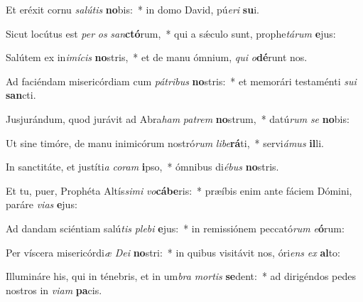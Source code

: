 \item Et eréxit cornu \textit{salútis} \textbf{no}bis:~* in domo David, pú\textit{eri} \textbf{su}i.
\item Sicut locútus est \textit{per} \textit{os} \textit{san}\textbf{ctó}rum,~* qui a sǽculo sunt, prophe\textit{tárum} \textbf{e}jus:
\item Salútem ex in\textit{imícis} \textbf{no}stris,~* et de manu ómnium, \textit{qui} \textit{o}\textbf{dé}runt nos.
\item Ad faciéndam misericórdiam cum \textit{pátribus} \textbf{no}stris:~* et memorári testaménti \textit{sui} \textbf{san}cti.
\item Jusjurándum, quod jurávit ad Abra\textit{ham} \textit{patrem} \textbf{no}strum,~* datú\textit{rum} \textit{se} \textbf{no}bis:
\item Ut sine timóre, de manu inimicórum nostró\textit{rum} \textit{libe}\textbf{rá}ti,~* servi\hspace{0.03em}\textit{ámus} \textbf{il}li.
\item In sanctitáte, et justíti\textit{a} \textit{coram} \textbf{i}pso,~* ómnibus di\textit{ébus} \textbf{no}stris.
\item Et tu, puer, Prophéta Altís\textit{simi} \textit{vo}\textbf{cá}\textbf{be}ris:~* præíbis enim ante fáciem Dómini, paráre \textit{vias} \textbf{e}jus:
\item Ad dandam sciéntiam salú\textit{tis} \textit{plebi} \textbf{e}jus:~* in remissiónem peccató\textit{rum} \textit{e}\textbf{ó}rum:
\item Per víscera misericórdi\textit{æ} \textit{Dei} \textbf{no}stri:~* in quibus visitávit nos, óri\textit{ens} \textit{ex} \textbf{al}to:
\item Illumináre his, qui in ténebris, et in um\textit{bra} \textit{mortis} \textbf{se}dent:~* ad dirigéndos pedes nostros in \textit{viam} \textbf{pa}cis.
